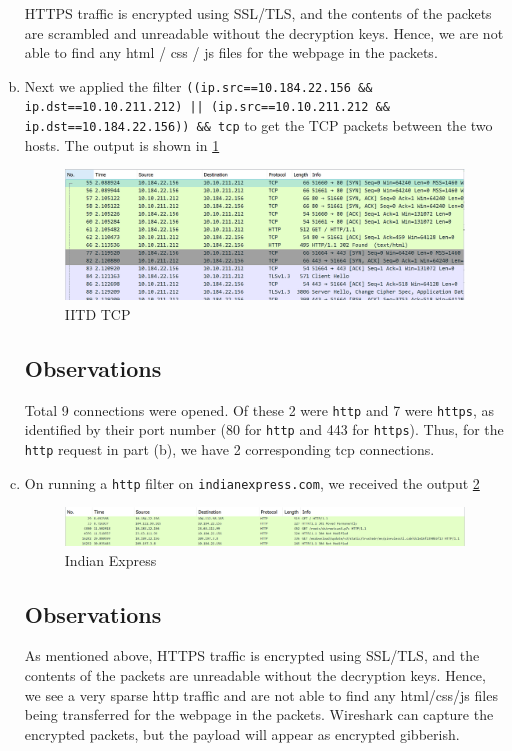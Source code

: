 \documentclass{article}
\begin{document}
\begin{enumerate}[a.]
    HTTPS traffic is encrypted using SSL/TLS, and the contents of the packets are scrambled and unreadable without the decryption keys. Hence, we are not able to find any html / css / js files for the webpage in the packets.

    
    \item Next we applied the filter {\tt ((ip.src==10.184.22.156 \&\& ip.dst==10.10.211.212) || (ip.src==10.10.211.212 \&\& ip.dst==10.184.22.156)) \&\& tcp} to get the TCP packets between the two hosts. The output is shown in \cref{fig:IITDTCP}
    \begin{figure}[!ht]
        \centering
        \includegraphics[scale=0.5]{images/IITD tcp.png}
        \caption{IITD TCP}
        \label{fig:IITDTCP}
    \end{figure}
    \subsection*{Observations}
    Total 9 connections were opened. Of these 2 were {\tt http} and 7 were {\tt https}, as identified by their port number (80 for {\tt http} and 443 for {\tt https}). Thus, for the {\tt http} request in part (b), we have 2 corresponding tcp connections. 

    \item On running a {\tt http} filter on {\tt indianexpress.com}, we received the output \cref{fig:IndianExpress}
    \begin{figure}[!ht]
        \centering
        \includegraphics[scale=0.5]{images/indianexpress.png}
        \caption{Indian Express}
        \label{fig:IndianExpress}
    \end{figure}
    \subsection*{Observations}
    As mentioned above, HTTPS traffic is encrypted using SSL/TLS, and the contents of the packets are unreadable without the decryption keys. Hence, we see a very sparse http traffic and are not able to find any html/css/js files being transferred for the webpage in the packets. Wireshark can capture the encrypted packets, but the payload will appear as encrypted gibberish.
\end{enumerate}
\end{document}
